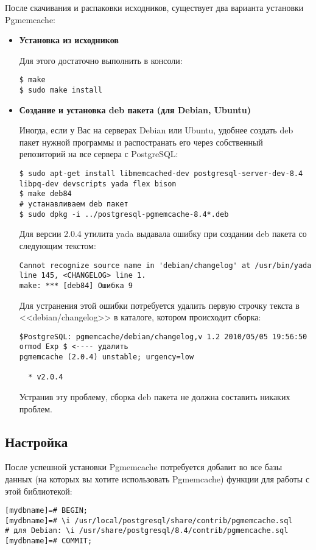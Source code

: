 После скачивания и распаковки исходников, существует два варианта установки Pgmemcache:
\begin{itemize}
\item \textbf{Установка из исходников}

Для этого достаточно выполнить в консоли:
\begin{lstlisting}[label=lst:pgcache1,caption=Установка из исходников]
$ make
$ sudo make install
\end{lstlisting}
\item \textbf{Создание и установка deb пакета (для Debian, Ubuntu)}

Иногда, если у Вас на серверах Debian или Ubuntu, удобнее создать deb пакет нужной программы и 
распостранать его через собственный репозиторий на все сервера с PostgreSQL:
\begin{lstlisting}[label=lst:pgcache2,caption=Создание и установка deb пакета]
$ sudo apt-get install libmemcached-dev postgresql-server-dev-8.4 libpq-dev devscripts yada flex bison
$ make deb84
# устанавливаем deb пакет
$ sudo dpkg -i ../postgresql-pgmemcache-8.4*.deb
\end{lstlisting}

Для версии 2.0.4 утилита yada выдавала ошибку при создании deb пакета со следующим текстом:
\begin{lstlisting}[label=lst:pgcache3,caption=Создание и установка deb пакета]
Cannot recognize source name in 'debian/changelog' at /usr/bin/yada line 145, <CHANGELOG> line 1.
make: *** [deb84] Ошибка 9
\end{lstlisting}

Для устранения этой ошибки потребуется удалить первую строчку текста в <<debian/changelog>> в каталоге, котором происходит сборка:
\begin{lstlisting}[label=lst:pgcache4,caption=Создание и установка deb пакета]
$PostgreSQL: pgmemcache/debian/changelog,v 1.2 2010/05/05 19:56:50 ormod Exp $ <---- удалить
pgmemcache (2.0.4) unstable; urgency=low

  * v2.0.4
\end{lstlisting}

Устранив эту проблему, сборка deb пакета не должна составить никаких проблем.
\end{itemize}


\subsection{Настройка}
После успешной установки Pgmemcache потребуется добавит во все базы данных (на которых вы хотите использовать Pgmemcache) 
функции для работы с этой библиотекой:
\begin{lstlisting}[label=lst:pgcache5,caption=Настройка]
% psql [mydbname] [pguser]
[mydbname]=# BEGIN;
[mydbname]=# \i /usr/local/postgresql/share/contrib/pgmemcache.sql
# для Debian: \i /usr/share/postgresql/8.4/contrib/pgmemcache.sql
[mydbname]=# COMMIT;
\end{lstlisting}

